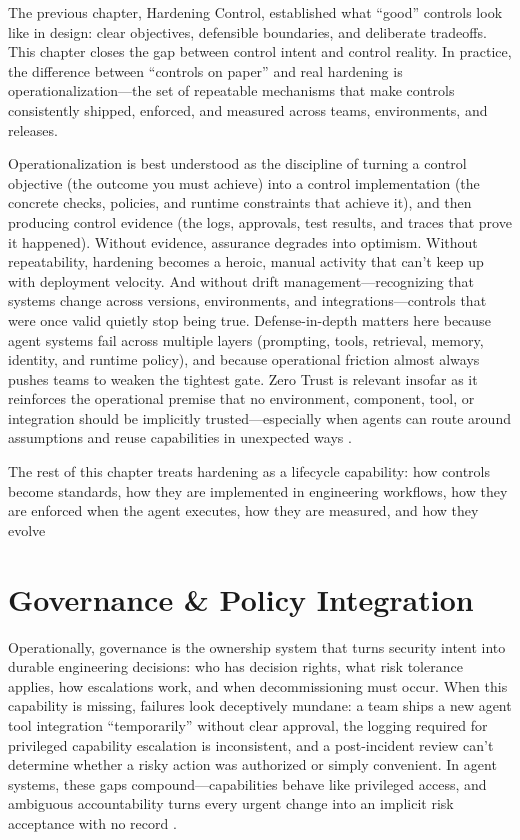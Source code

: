 \begin{TNtwocol}

  The previous chapter, Hardening Control, established what “good” controls look like in design: clear objectives, defensible boundaries, and deliberate tradeoffs. This chapter closes the gap between control intent and control reality. In practice, the difference between “controls on paper” and real hardening is operationalization—the set of repeatable mechanisms that make controls consistently shipped, enforced, and measured across teams, environments, and releases.

  Operationalization is best understood as the discipline of turning a control objective (the outcome you must achieve) into a control implementation (the concrete checks, policies, and runtime constraints that achieve it), and then producing control evidence (the logs, approvals, test results, and traces that prove it happened). Without evidence, assurance degrades into optimism. Without repeatability, hardening becomes a heroic, manual activity that can't keep up with deployment velocity. And without drift management—recognizing that systems change across versions, environments, and integrations—controls that were once valid quietly stop being true. Defense-in-depth matters here because agent systems fail across multiple layers (prompting, tools, retrieval, memory, identity, and runtime policy), and because operational friction almost always pushes teams to weaken the tightest gate. Zero Trust is relevant insofar as it reinforces the operational premise that no environment, component, tool, or integration should be implicitly trusted—especially when agents can route around assumptions and reuse capabilities in unexpected ways \cite{nist-sp800-207,cisa-ztmm-v2}.

  The rest of this chapter treats hardening as a lifecycle capability: how controls become standards, how they are implemented in engineering workflows, how they are enforced when the agent executes, how they are measured, and how they evolve

  \section{Governance \& Policy Integration}

  Operationally, governance is the ownership system that turns security intent into durable engineering decisions: who has decision rights, what risk tolerance applies, how escalations work, and when decommissioning must occur. When this capability is missing, failures look deceptively mundane: a team ships a new agent tool integration “temporarily” without clear approval, the logging required for privileged capability escalation is inconsistent, and a post-incident review can't determine whether a risky action was authorized or simply convenient. In agent systems, these gaps compound—capabilities behave like privileged access, and ambiguous accountability turns every urgent change into an implicit risk acceptance with no record \cite{nist-airmf-100-1,nist-genai-600-1}.


\end{TNtwocol}
